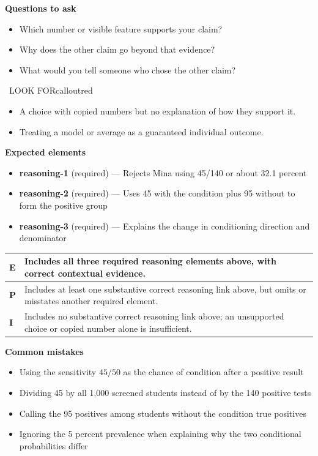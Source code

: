 \documentclass[11pt]{article}
\begin{document}
\textbf{Questions to ask}
\begin{itemize}[leftmargin=1.5em,itemsep=2pt,topsep=2pt]
  \item Which number or visible feature supports your claim?
  \item Why does the other claim go beyond that evidence?
  \item What would you tell someone who chose the other claim?
\end{itemize}

\begin{callout}{\IconWarn\ LOOK FOR}{calloutred}
\begin{itemize}[leftmargin=1.5em,itemsep=2pt,topsep=2pt]
  \item A choice with copied numbers but no explanation of how they support it.
  \item Treating a model or average as a guaranteed individual outcome.
\end{itemize}
\end{callout}


\textbf{Expected elements}
\begin{itemize}[leftmargin=1.5em,itemsep=2pt,topsep=2pt]
  \item \textbf{reasoning-1} (required) --- Rejects Mina using 45/140 or about 32.1 percent
  \item \textbf{reasoning-2} (required) --- Uses 45 with the condition plus 95 without to form the positive group
  \item \textbf{reasoning-3} (required) --- Explains the change in conditioning direction and denominator
\end{itemize}

{\small\renewcommand{\arraystretch}{1.25}
\noindent\begin{tabular}{|p{0.5in}|p{5.9in}|}
\hline
\textbf{E} & Includes all three required reasoning elements above, with correct contextual evidence. \\ \hline
\textbf{P} & Includes at least one substantive correct reasoning link above, but omits or misstates another required element. \\ \hline
\textbf{I} & Includes no substantive correct reasoning link above; an unsupported choice or copied number alone is insufficient. \\ \hline
\end{tabular}}

\textbf{Common mistakes}
\begin{itemize}[leftmargin=1.5em,itemsep=2pt,topsep=2pt]
  \item Using the sensitivity $45/50$ as the chance of condition after a positive result
  \item Dividing 45 by all 1,000 screened students instead of by the 140 positive tests
  \item Calling the 95 positives among students without the condition true positives
  \item Ignoring the 5 percent prevalence when explaining why the two conditional probabilities differ
\end{itemize}
\end{document}
